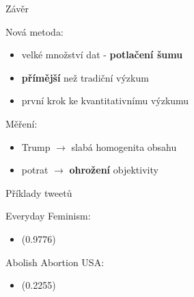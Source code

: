 \documentclass[notheorems,12pt]{beamer}
\begin{document}
\begin{frame}{Závěr}
    \begin{block}{Nová metoda:}
        \begin{itemize}
            \item velké množství dat - \textbf{potlačení šumu}
            \item \textbf{přímější} než tradiční výzkum
            \item první krok ke kvantitativnímu výzkumu
        \end{itemize}
    \end{block}

    \begin{block}{Měření:}
    	\begin{itemize}
            \item Trump $\rightarrow$ slabá homogenita obsahu
            \item potrat $\rightarrow$ \textbf{ohrožení} objektivity
    	\end{itemize}
    \end{block}
\end{frame}
\begin{frame}

\end{frame}
\begin{frame}{Příklady tweetů}
    \begin{block}{Everyday Feminism:}
        \begin{itemize}
            \item \begin{footnotesize} \end{footnotesize} (0.9776)
        \end{itemize}
    \end{block}
    \begin{block}{Abolish Abortion USA:}
        \begin{itemize}
            \item \begin{footnotesize}  \end{footnotesize} (0.2255)
        \end{itemize}
    \end{block}
\end{frame}
\end{document}
